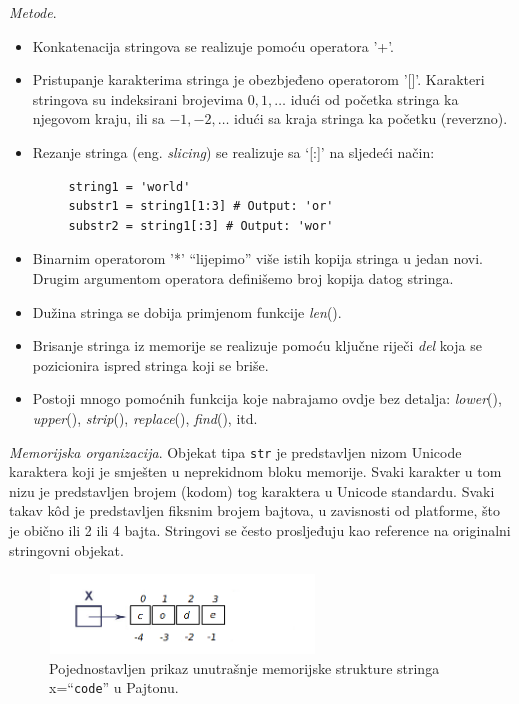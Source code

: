 \textit{Metode}.
\begin{itemize}
	\item Konkatenacija stringova se realizuje pomoću operatora '+'. 
	\item Pristupanje karakterima stringa je obezbjeđeno operatorom '[]'. Karakteri stringova su indeksirani brojevima $0, 1,\ldots$ idući od početka stringa ka njegovom kraju, ili sa $-1, -2,\ldots$ idući sa kraja stringa ka početku  (reverzno). 
	\item Rezanje stringa (eng. \textit{slicing}) se realizuje sa `[:]' na sljedeći način:
	\begin{verbatim}
	 string1 = 'world'
	 substr1 = string1[1:3] # Output: 'or'
	 substr2 = string1[:3] # Output: 'wor'
	\end{verbatim}
	
	\item  Binarnim operatorom '*' ``lijepimo'' više istih kopija stringa u jedan novi. Drugim argumentom operatora definišemo broj kopija datog stringa.  
	\item Dužina stringa se dobija primjenom funkcije \emph{len}(). 
	\item Brisanje stringa iz memorije se realizuje pomoću ključne riječi \textit{del} koja se pozicionira ispred stringa koji se briše. 
    \item Postoji mnogo pomoćnih funkcija koje nabrajamo ovdje bez detalja: \textit{lower}(), \textit{upper}(), \textit{strip}(), \textit{replace}(), \textit{find}(), itd. 
\end{itemize}

\textit{Memorijska organizacija}. Objekat tipa \texttt{str} je predstavljen nizom Unicode karaktera koji je smješten u neprekidnom bloku memorije. Svaki karakter u tom nizu je predstavljen brojem (kodom) tog karaktera u Unicode standardu. Svaki takav k\^od je predstavljen fiksnim brojem bajtova, u zavisnosti od platforme, što je obično ili 2 ili 4 bajta. Stringovi se često prosljeđuju kao reference na originalni stringovni objekat. %

	\begin{figure}
	\centering
	\includegraphics[width=200pt,height=60pt]{slike/str_mem_organization.png}
	\caption{Pojednostavljen prikaz unutrašnje memorijske strukture stringa x=``\texttt{code}''   u Pajtonu. }
\end{figure}


